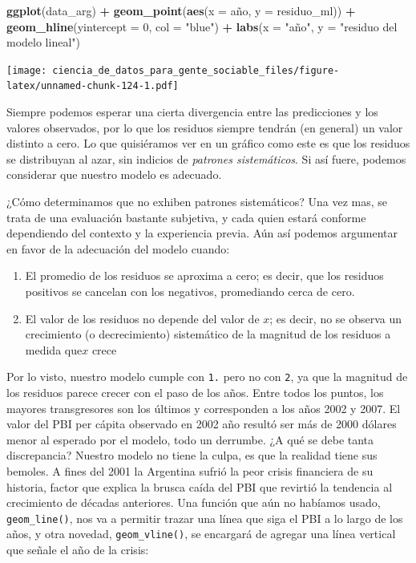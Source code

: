 \documentclass[]{book}
\newenvironment{Shaded}{\begin{snugshade}}{\end{snugshade}}
\newcommand{\KeywordTok}[1]{\textcolor[rgb]{0.13,0.29,0.53}{\textbf{#1}}}
\newcommand{\DataTypeTok}[1]{\textcolor[rgb]{0.13,0.29,0.53}{#1}}
\newcommand{\DecValTok}[1]{\textcolor[rgb]{0.00,0.00,0.81}{#1}}
\newcommand{\StringTok}[1]{\textcolor[rgb]{0.31,0.60,0.02}{#1}}
\newcommand{\OperatorTok}[1]{\textcolor[rgb]{0.81,0.36,0.00}{\textbf{#1}}}
\newcommand{\NormalTok}[1]{#1}
\providecommand{\tightlist}{%
  \setlength{\itemsep}{0pt}\setlength{\parskip}{0pt}}
\begin{document}
\begin{Shaded}
\begin{Highlighting}[]
\KeywordTok{ggplot}\NormalTok{(data_arg) }\OperatorTok{+}
\StringTok{    }\KeywordTok{geom_point}\NormalTok{(}\KeywordTok{aes}\NormalTok{(}\DataTypeTok{x =}\NormalTok{ año, }\DataTypeTok{y =}\NormalTok{ residuo_ml)) }\OperatorTok{+}
\StringTok{    }\KeywordTok{geom_hline}\NormalTok{(}\DataTypeTok{yintercept =} \DecValTok{0}\NormalTok{, }\DataTypeTok{col =} \StringTok{"blue"}\NormalTok{) }\OperatorTok{+}
\StringTok{    }\KeywordTok{labs}\NormalTok{(}\DataTypeTok{x =} \StringTok{"año"}\NormalTok{, }\DataTypeTok{y =} \StringTok{"residuo del modelo lineal"}\NormalTok{)}
\end{Highlighting}
\end{Shaded}

\texttt{[image: ciencia\_de\_datos\_para\_gente\_sociable\_files/figure-latex/unnamed-chunk-124-1.pdf]}

Siempre podemos esperar una cierta divergencia entre las predicciones y
los valores observados, por lo que los residuos siempre tendrán (en
general) un valor distinto a cero. Lo que quisiéramos ver en un gráfico
como este es que los residuos se distribuyan al azar, sin indicios de
\emph{patrones sistemáticos}. Si así fuere, podemos considerar que
nuestro modelo es adecuado.

¿Cómo determinamos que no exhiben patrones sistemáticos? Una vez mas, se
trata de una evaluación bastante subjetiva, y cada quien estará conforme
dependiendo del contexto y la experiencia previa. Aún así podemos
argumentar en favor de la adecuación del modelo cuando:

\begin{enumerate}
\def\labelenumi{\arabic{enumi}.}
\tightlist
\item
  El promedio de los residuos se aproxima a cero; es decir, que los
  residuos positivos se cancelan con los negativos, promediando cerca de
  cero.
\item
  El valor de los residuos no depende del valor de \(x\); es decir, no
  se observa un crecimiento (o decrecimiento) sistemático de la magnitud
  de los residuos a medida que\(x\) crece
\end{enumerate}

Por lo visto, nuestro modelo cumple con \texttt{1.} pero no con
\texttt{2}, ya que la magnitud de los residuos parece crecer con el paso
de los años. Entre todos los puntos, los mayores transgresores son los
últimos y corresponden a los años 2002 y 2007. El valor del PBI per
cápita observado en 2002 año resultó ser más de 2000 dólares menor al
esperado por el modelo, todo un derrumbe. ¿A qué se debe tanta
discrepancia? Nuestro modelo no tiene la culpa, es que la realidad tiene
sus bemoles. A fines del 2001 la Argentina sufrió la peor crisis
financiera de su historia, factor que explica la brusca caída del PBI
que revirtió la tendencia al crecimiento de décadas anteriores. Una
función que aún no habíamos usado, \texttt{geom\_line()}, nos va a
permitir trazar una línea que siga el PBI a lo largo de los años, y otra
novedad, \texttt{geom\_vline()}, se encargará de agregar una línea
vertical que señale el año de la crisis:
\end{document}
